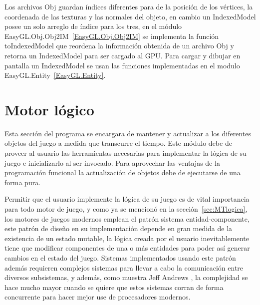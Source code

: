 Los archivos Obj guardan índices diferentes para de la posición de los vértices, la coordenada de las texturas y las normales del objeto, en cambio un IndexedModel posee un solo arreglo de índice para los tres, en el módulo EasyGL.Obj.Obj2IM~\ref{EasyGL.Obj.Obj2IM} se implementa la función toIndexedModel que reordena la información obtenida de un archivo Obj y retorna un IndexedModel para ser cargado al GPU. Para cargar y dibujar en pantalla un IndexedModel se usan las funciones implementadas en el modulo EasyGL.Entity~\ref{EasyGL.Entity}.




\section{Motor lógico}

Esta sección del programa se encargara de mantener y actualizar a los diferentes objetos del juego a medida que transcurre el tiempo. Este módulo debe de proveer al usuario las herramientas necesarias para implementar la lógica de su juego e inicializarlo al ser invocado. Para aprovechar las ventajas de la programación funcional la actualización de objetos debe de ejecutarse de una forma pura.

Permitir que el usuario implemente la lógica de su juego es de vital importancia para todo motor de juego, y como ya se mencionó en la sección~\ref{sec:MTlogica}, los motores de juegos modernos emplean el patrón sistema entidad-componente, este patrón de diseño en su implementación depende en gran medida de la existencia de un estado mutable, la lógica creada por el usuario inevitablemente tiene que modificar componentes de una o más entidades para poder así generar cambios en el estado del juego. Sistemas implementados usando este patrón además requieren complejos sistemas para llevar a cabo la comunicación entre diversos subsistemas, y además, como muestra Jeff Andrews \cite{andrews2009designing}, la complejidad se hace mucho mayor cuando se quiere que estos sistemas corran de forma concurrente para hacer mejor use de procesadores modernos.

